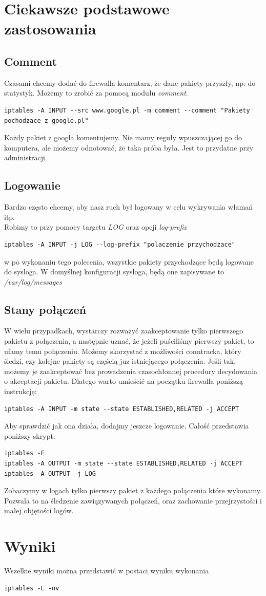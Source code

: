 \documentclass[a4paper,11pt]{article}
\begin{document}
\section{Ciekawsze podstawowe zastosowania}
\subsection{Comment}
Czasami chcemy dodać do firewalla komentarz, że dane pakiety przyszły, np: do statystyk. Możemy to zrobić za pomocą modułu \textit{comment}.
\begin{verbatim}
iptables -A INPUT --src www.google.pl -m comment --comment "Pakiety pochodzace z google.pl"
\end{verbatim}
Każdy pakiet z googla komentujemy. Nie mamy reguły wpuszczającej go do komputera, ale możemy odnotować, że taka próba była. Jest to przydatne przy administracji.
\subsection{Logowanie}
Bardzo często chcemy, aby nasz ruch był logowany w celu wykrywania włamań itp.\\
Robimy to przy pomocy targetu \textit{LOG} oraz opcji \textit{log-prefix}
\begin{verbatim}
iptables -A INPUT -j LOG --log-prefix "polaczenie przychodzace"
\end{verbatim}
w po wykonaniu tego polecenia, wszystkie pakiety przychodzące będą logowane do sysloga. W domyślnej konfiguracji sysloga, będą one zapisywane to \textit{/var/log/messages}
\subsection{Stany połączeń}
W wielu przypadkach, wystarczy rozważyć zaakceptowanie tylko pierwszego pakietu z połączenia, a następnie uznać, że jeżeli puściliśmy pierwszy pakiet, to ufamy temu połączeniu. Możemy skorzystać z możliwości conntracka, który śledzi, czy kolejne pakiety są częścią juz istniejącego połączenia. Jeśli tak, możemy je zaakceptować bez prowadzenia czasochłonnej procedury decydowania o akceptacji pakietu.
Dlatego warto umieścić na początku firewalla poniższą instrukcję:
\begin{verbatim}
iptables -A INPUT -m state --state ESTABLISHED,RELATED -j ACCEPT
\end{verbatim}
Aby sprawdzić jak ona działa, dodajmy jeszcze logowanie. Całość przedstawia poniższy skrypt:
\begin{verbatim}
iptables -F
iptables -A OUTPUT -m state --state ESTABLISHED,RELATED -j ACCEPT
iptables -A OUTPUT -j LOG
\end{verbatim}
Zobaczymy w logach tylko pierwszy pakiet z każdego połączenia które wykonamy. Pozwala to na śledzenie zawiązywanych połączeń, oraz zachowanie przejrzystości i małej objętości logów.
\section{Wyniki}
Wszelkie wyniki można przedstawić w postaci wyniku wykonania
\begin{verbatim}
iptables -L -nv
\end{verbatim}
\end{document}

